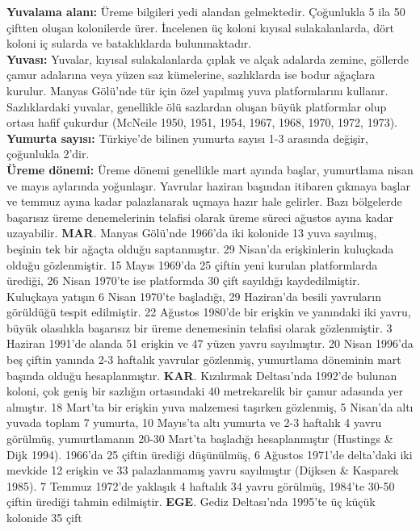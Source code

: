 \documentclass[
  letterpaper,
  DIV=11,
  numbers=noendperiod]{scrreprt}
\begin{document}
\textbf{Yuvalama alanı:} Üreme bilgileri yedi alandan gelmektedir.
Çoğunlukla 5 ila 50 çiftten oluşan kolonilerde ürer. İncelenen üç koloni
kıyısal sulakalanlarda, dört koloni iç sularda ve bataklıklarda
bulunmaktadır.\\
\textbf{Yuvası:} Yuvalar, kıyısal sulakalanlarda çıplak ve alçak
adalarda zemine, göllerde çamur adalarına veya yüzen saz kümelerine,
sazlıklarda ise bodur ağaçlara kurulur. Manyas Gölü'nde tür için özel
yapılmış yuva platformlarını kullanır. Sazlıklardaki yuvalar, genellikle
ölü sazlardan oluşan büyük platformlar olup ortası hafif çukurdur
(McNeile 1950, 1951, 1954, 1967, 1968, 1970, 1972, 1973).\\
\textbf{Yumurta sayısı:} Türkiye'de bilinen yumurta sayısı 1-3 arasında
değişir, çoğunlukla 2'dir.\\
\textbf{Üreme dönemi:} Üreme dönemi genellikle mart ayında başlar,
yumurtlama nisan ve mayıs aylarında yoğunlaşır. Yavrular haziran
başından itibaren çıkmaya başlar ve temmuz ayına kadar palazlanarak
uçmaya hazır hale gelirler. Bazı bölgelerde başarısız üreme
denemelerinin telafisi olarak üreme süreci ağustos ayına kadar
uzayabilir. \textbf{MAR}. Manyas Gölü'nde 1966'da iki kolonide 13 yuva
sayılmış, beşinin tek bir ağaçta olduğu saptanmıştır. 29 Nisan'da
erişkinlerin kuluçkada olduğu gözlenmiştir. 15 Mayıs 1969'da 25 çiftin
yeni kurulan platformlarda ürediği, 26 Nisan 1970'te ise platformda 30
çift sayıldığı kaydedilmiştir. Kuluçkaya yatışın 6 Nisan 1970'te
başladığı, 29 Haziran'da besili yavruların görüldüğü tespit edilmiştir.
22 Ağustos 1980'de bir erişkin ve yanındaki iki yavru, büyük olasılıkla
başarısız bir üreme denemesinin telafisi olarak gözlenmiştir. 3 Haziran
1991'de alanda 51 erişkin ve 47 yüzen yavru sayılmıştır. 20 Nisan
1996'da beş çiftin yanında 2-3 haftalık yavrular gözlenmiş, yumurtlama
döneminin mart başında olduğu hesaplanmıştır. \textbf{KAR}. Kızılırmak
Deltası'nda 1992'de bulunan koloni, çok geniş bir sazlığın ortasındaki
40 metrekarelik bir çamur adasında yer almıştır. 18 Mart'ta bir erişkin
yuva malzemesi taşırken gözlenmiş, 5 Nisan'da altı yuvada toplam 7
yumurta, 10 Mayıs'ta altı yumurta ve 2-3 haftalık 4 yavru görülmüş,
yumurtlamanın 20-30 Mart'ta başladığı hesaplanmıştır (Hustings \& Dijk
1994). 1966'da 25 çiftin ürediği düşünülmüş, 6 Ağustos 1971'de
delta'daki iki mevkide 12 erişkin ve 33 palazlanmamış yavru sayılmıştır
(Dijksen \& Kasparek 1985). 7 Temmuz 1972'de yaklaşık 4 haftalık 34
yavru görülmüş, 1984'te 30-50 çiftin ürediği tahmin edilmiştir.
\textbf{EGE}. Gediz Deltası'nda 1995'te üç küçük kolonide 35 çift
\end{document}
